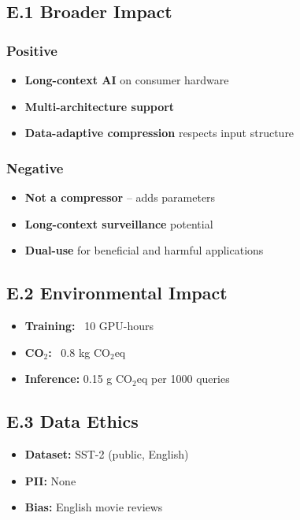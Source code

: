 \subsection{E.1 Broader Impact}

\subsubsection{Positive}
\begin{itemize}
\item \textbf{Long-context AI} on consumer hardware
\item \textbf{Multi-architecture support}
\item \textbf{Data-adaptive compression} respects input structure

\end{itemize}
\subsubsection{Negative}
\begin{itemize}
\item \textbf{Not a compressor} -- adds parameters
\item \textbf{Long-context surveillance} potential
\item \textbf{Dual-use} for beneficial and harmful applications

\end{itemize}
\subsection{E.2 Environmental Impact}

\begin{itemize}
\item \textbf{Training:} ~10 GPU-hours
\item \textbf{CO$_2$:} ~0.8 kg CO$_2$eq
\item \textbf{Inference:} 0.15 g CO$_2$eq per 1000 queries

\end{itemize}
\subsection{E.3 Data Ethics}

\begin{itemize}
\item \textbf{Dataset:} SST-2 (public, English)
\item \textbf{PII:} None
\item \textbf{Bias:} English movie reviews

\end{itemize}
